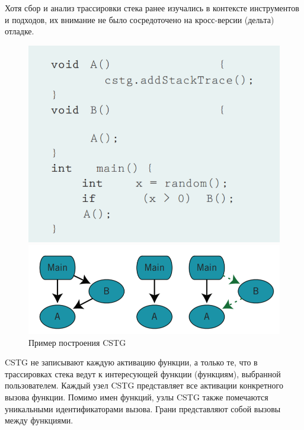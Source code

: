 Хотя сбор и анализ трассировки стека ранее изучались в контексте инструментов и подходов, их внимание не было сосредоточено на кросс-версии (дельта) отладке.

\begin{figure}[h]
	\centering
	\begin{minipage}{0.45\textwidth}
	\centering
	\includegraphics[width=1\textwidth]{ResearchNotes/rndhpc_not_edt_2021_11_10/krekhtunova/prog_ex.png}
	\end{minipage}
	\begin{minipage}{0.5\textwidth}
	\centering
	\includegraphics[width=1\textwidth]{ResearchNotes/rndhpc_not_edt_2021_11_10/krekhtunova/cstg.png}
	\end{minipage}
	\caption{Пример построения CSTG} 
\end{figure}

CSTG не записывают каждую активацию функции, а только те, что в трассировках стека ведут к интересующей функции (функциям), выбранной пользователем. Каждый узел CSTG представляет все активации конкретного вызова функции. Помимо имен функций, узлы CSTG также помечаются уникальными идентификаторами вызова. Грани представляют собой вызовы между функциями. 


